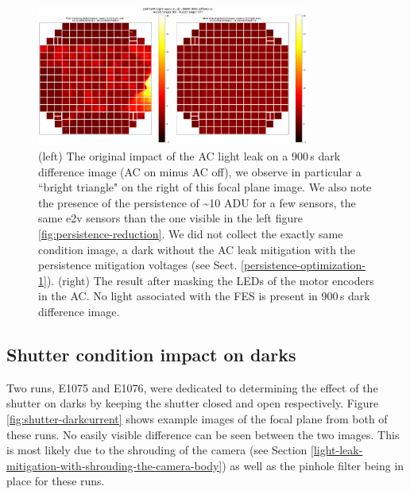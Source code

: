 \begin{figure}[ht]
\begin{centering}
\includegraphics[width=0.8\textwidth]{figures/AC_LightLeak_study.png}
\caption{ (left) The original impact of the AC light leak on a 900\,s dark difference image (AC on minus AC off), we observe in particular a ``bright triangle" on the right of this focal plane image. We also note the presence of the persistence of \textasciitilde 10 ADU for a few sensors, the same e2v sensors than the one visible in the left figure \ref{fig:persistence-reduction}. We did not collect the exactly same condition image, a dark without the AC leak mitigation with the persistence mitigation voltages (see Sect. \ref{persistence-optimization-1}). (right) The result after masking the LEDs of the motor encoders in the AC.  No light associated with the FES is present in 900\,s dark difference image.  \label{fig:ac-light-leak}}
\end{centering}
\end{figure}

\subsection{Shutter condition impact on
darks}\label{shutter-condition-impact-on-darks}

Two runs, E1075 and E1076, were dedicated to determining the effect of the shutter on darks by keeping the shutter closed and open respectively. Figure \ref{fig:shutter-darkcurrent} shows example images of the focal plane from both of these runs. No easily visible difference can be seen between the two images. This is most likely due to the shrouding of the camera (see Section \ref{light-leak-mitigation-with-shrouding-the-camera-body}) as well as the pinhole filter being in place for these runs.

